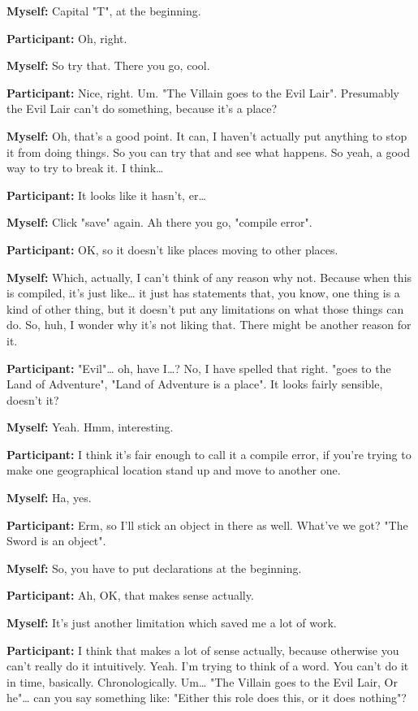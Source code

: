 \documentclass[11pt]{report}
\begin{document}
\begin{linenumbers}
\textbf{Myself:} Capital "T", at the beginning.

\textbf{Participant:} Oh, right.

\textbf{Myself:} So try that. There you go, cool.

\textbf{Participant:} Nice, right. Um. "The Villain goes to the Evil Lair".
Presumably the Evil Lair can't do something, because it's a
place?

\textbf{Myself:} Oh, that's a good point. It can, I haven't actually put anything to stop it from doing things. So you can try that and see what happens. So yeah, a good way to try to break it. I think\ldots{}

\textbf{Participant:} It looks like it hasn't, er\ldots{}

\textbf{Myself:} Click "save" again. Ah there you go, "compile error".

\textbf{Participant:} OK, so it doesn't like places moving to other places.

\textbf{Myself:} Which, actually, I can't think of any reason why not. Because when this is compiled, it's just like\ldots{} it just has statements that, you know, one thing is a kind of other thing, but it doesn't put any limitations on what those things can do. So, huh, I wonder why it's not liking that. There might be another reason for it.

\textbf{Participant:} "Evil"\ldots{} oh, have I\ldots{}? No, I have spelled that right. "goes to the Land of Adventure", "Land of Adventure is a place". It looks fairly sensible, doesn't it?

\textbf{Myself:} Yeah. Hmm, interesting.

\textbf{Participant:} I think it's fair enough to call it a compile error, if you're trying to make one geographical location stand up and move to another one.

\textbf{Myself:} Ha, yes.

\textbf{Participant:} Erm, so I'll stick an object in there as well. What've we got? "The Sword is an object".

\textbf{Myself:} So, you have to put declarations at the
beginning.

\textbf{Participant:} Ah, OK, that makes sense actually.

\textbf{Myself:} It's just another limitation which saved me a lot of work.

\textbf{Participant:} I think that makes a lot of sense actually, because otherwise you can't really do it intuitively. Yeah. I'm trying to think of a word. You can't do it in time, basically. Chronologically. Um\ldots{} "The Villain goes to the Evil Lair, Or he"\ldots{} can you say something like: "Either this role does this, or it does nothing"?


\end{linenumbers}
\end{document}
